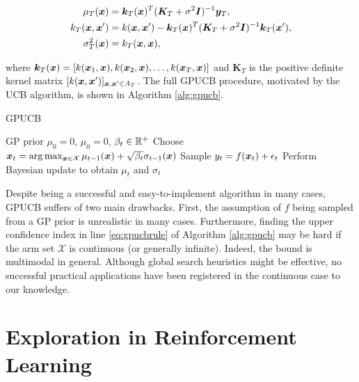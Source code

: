\begin{align}
\mu_T(\boldsymbol{x}) &= \boldsymbol{k}_T(\boldsymbol{x})^T(\boldsymbol{K}_T+\sigma^2\boldsymbol{I})^{-1}\boldsymbol{y}_T, \\
k_T(\boldsymbol{x},\boldsymbol{x}') &= k(\boldsymbol{x},\boldsymbol{x}')-\boldsymbol{k}_T(\boldsymbol{x})^T(\boldsymbol{K}_T+\sigma^2\boldsymbol{I})^{-1}\boldsymbol{k}_T(\boldsymbol{x}'),\\
\sigma^2_T(\boldsymbol{x}) &= k_T(\boldsymbol{x},\boldsymbol{x}),\\
\end{align}

where $\boldsymbol{k}_T(\boldsymbol{x}) = [k(\boldsymbol{x}_1,\boldsymbol{x}),k(\boldsymbol{x}_2,\boldsymbol{x}),\dots,k(\boldsymbol{x}_T,\boldsymbol{x})]$ and $\boldsymbol{K}_T$ is the positive definite kernel matrix $[k(\boldsymbol{x},\boldsymbol{x}')]_{\boldsymbol{x},\boldsymbol{x}'\in A_T}$.
The full \gls{GPUCB} procedure, motivated by the \gls{UCB} algorithm, is shown in Algorithm \ref{alg:gpucb}.

\begin{algorithm}[t]
	\caption{\gls{GPUCB}}
	\label{alg:gpucb}
	\begin{algorithmic}[1]
	 GP prior $\mu_0=0$, $\mu_0=0$, $\beta_t\in\mathbb{R}^+$
		\State Choose $\boldsymbol{x}_t = \arg\max_{\boldsymbol{x}\in\mathcal{X}}\mu_{t-1}(\boldsymbol{x})+\sqrt{\beta_t}\sigma_{t-1}(\boldsymbol{x})$ \label{eq:gpucbrule}
		\State Sample $y_t = f(\boldsymbol{x}_t)+\epsilon_t$
		\State Perform Bayesian update to obtain $\mu_t$ and $\sigma_t$
	\EndFor
	\end{algorithmic}
\end{algorithm}

Despite being a successful and easy-to-implement algorithm in many cases, \gls{GPUCB} suffers of two main drawbacks. First, the assumption of $f$ being sampled from a \gls{GP} prior is unrealistic in many cases. Furthermore, finding the upper confidence index in line \ref{eq:gpucbrule} of Algorithm \ref{alg:gpucb} may be hard if the arm set $\mathcal{X}$ is continuous (or generally infinite). Indeed, the bound is multimodal in general. Although global search heuristics might be effective, no successful practical applications have been registered in the continuous case to our knowledge. 

\section{Exploration in Reinforcement Learning}

